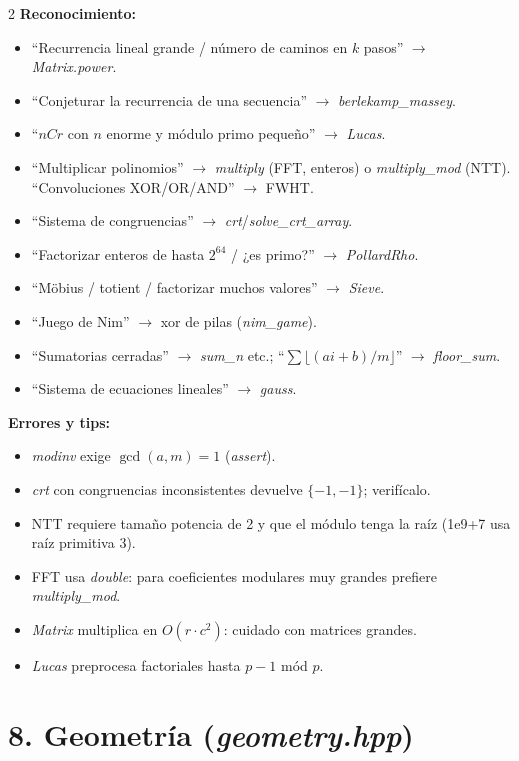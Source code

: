 \documentclass[10pt]{article}
\begin{document}
\begin{multicols}{2}
\textbf{Reconocimiento:}
\begin{itemize}\setlength{\itemsep}{1pt}
  \item ``Recurrencia lineal grande / número de caminos en $k$ pasos'' $\to$ \textit{Matrix.power}.
  \item ``Conjeturar la recurrencia de una secuencia'' $\to$ \textit{berlekamp\_massey}.
  \item ``$nCr$ con $n$ enorme y módulo primo pequeño'' $\to$ \textit{Lucas}.
  \item ``Multiplicar polinomios'' $\to$ \textit{multiply} (FFT, enteros) o \textit{multiply\_mod} (NTT). ``Convoluciones XOR/OR/AND'' $\to$ FWHT.
  \item ``Sistema de congruencias'' $\to$ \textit{crt}/\textit{solve\_crt\_array}.
  \item ``Factorizar enteros de hasta $2^{64}$ / ¿es primo?'' $\to$ \textit{PollardRho}.
  \item ``Möbius / totient / factorizar muchos valores'' $\to$ \textit{Sieve}.
  \item ``Juego de Nim'' $\to$ xor de pilas (\textit{nim\_game}).
  \item ``Sumatorias cerradas'' $\to$ \textit{sum\_n} etc.; ``$\sum \lfloor (ai+b)/m \rfloor$'' $\to$ \textit{floor\_sum}.
  \item ``Sistema de ecuaciones lineales'' $\to$ \textit{gauss}.
\end{itemize}

\textbf{Errores y tips:}
\begin{itemize}\setlength{\itemsep}{1pt}
  \item \textit{modinv} exige $\gcd(a, m) = 1$ (\textit{assert}).
  \item \textit{crt} con congruencias inconsistentes devuelve $\{-1, -1\}$; verifícalo.
  \item NTT requiere tamaño potencia de 2 y que el módulo tenga la raíz (1e9+7 usa raíz primitiva 3).
  \item FFT usa \textit{double}: para coeficientes modulares muy grandes prefiere \textit{multiply\_mod}.
  \item \textit{Matrix} multiplica en $O(r \cdot c^2)$: cuidado con matrices grandes.
  \item \textit{Lucas} preprocesa factoriales hasta $p-1$ mód $p$.
\end{itemize}

\section*{8. Geometría (\textit{geometry.hpp})}


\end{multicols}
\end{document}
